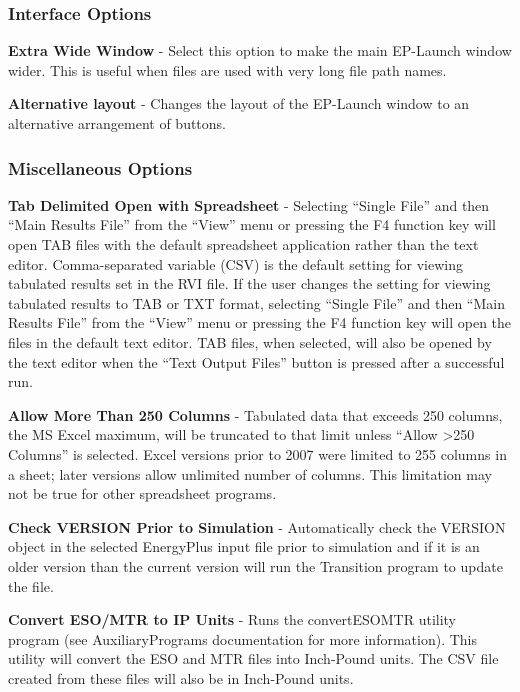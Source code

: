 \subsubsection{Interface Options}\label{interface-options}

\textbf{Extra Wide Window} - Select this option to make the main EP-Launch window wider. This is useful when files are used with very long file path names.

\textbf{Alternative layout} - Changes the layout of the EP-Launch window to an alternative arrangement of buttons.

\subsubsection{Miscellaneous Options}\label{miscellaneous-options}

\textbf{Tab Delimited Open with Spreadsheet} - Selecting ``Single File'' and then ``Main Results File'' from the ``View'' menu or pressing the F4 function key will open TAB files with the default spreadsheet application rather than the text editor. Comma-separated variable (CSV) is the default setting for viewing tabulated results set in the RVI file. If the user changes the setting for viewing tabulated results to TAB or TXT format, selecting ``Single File'' and then ``Main Results File'' from the ``View'' menu or pressing the F4 function key will open the files in the default text editor. TAB files, when selected, will also be opened by the text editor when the ``Text Output Files'' button is pressed after a successful run.

\textbf{Allow More Than 250 Columns} - Tabulated data that exceeds 250 columns, the MS Excel maximum, will be truncated to that limit unless ``Allow \textgreater{}250 Columns'' is selected. Excel versions prior to 2007 were limited to 255 columns in a sheet; later versions allow unlimited number of columns. This limitation may not be true for other spreadsheet programs.

\textbf{Check VERSION Prior to Simulation} - Automatically check the VERSION object in the selected EnergyPlus input file prior to simulation and if it is an older version than the current version will run the Transition program to update the file.

\textbf{Convert ESO/MTR to IP Units} - Runs the convertESOMTR utility program (see AuxiliaryPrograms documentation for more information). This utility will convert the ESO and MTR files into Inch-Pound units. The CSV file created from these files will also be in Inch-Pound units.

